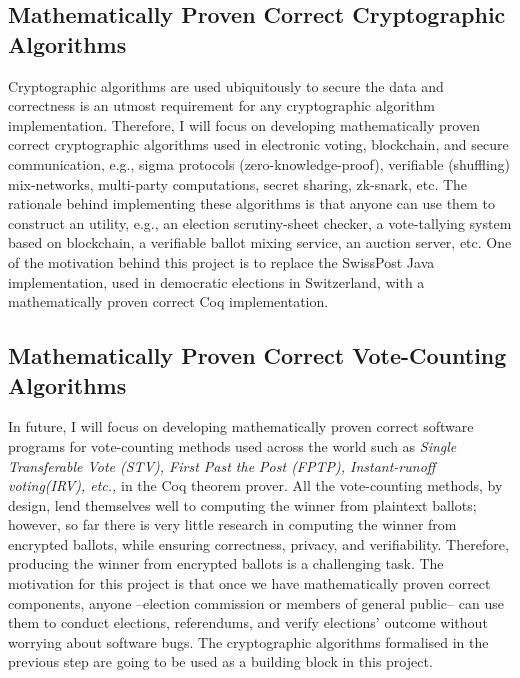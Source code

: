 \documentclass[11pt,a4paper,roman]{moderncv}
\begin{document}
\subsection{Mathematically Proven Correct Cryptographic Algorithms}
	Cryptographic algorithms are used ubiquitously to secure 
	the data and correctness is an utmost requirement for 
	any cryptographic algorithm implementation. Therefore, 
	I will focus on developing mathematically proven correct cryptographic 
	algorithms used in electronic voting, blockchain, and secure communication, e.g., 
  	sigma protocols (zero-knowledge-proof), verifiable (shuffling) mix-networks, 
  	multi-party computations, secret sharing, zk-snark, etc.
	The rationale behind implementing these algorithms is that anyone can use them to construct 
	an utility, e.g., an election scrutiny-sheet checker, 
	a vote-tallying system based on blockchain,
	a verifiable ballot mixing service, an auction server, etc. One of the motivation
	behind this project is to replace the SwissPost Java implementation, used in democratic elections in 
	Switzerland, with a mathematically proven correct Coq implementation.
	

	

\subsection{Mathematically Proven Correct Vote-Counting Algorithms}
In future, I will focus on developing mathematically proven correct
software programs for vote-counting methods used across the world
such as \textit{Single Transferable Vote (STV), 
First Past the Post (FPTP), Instant-runoff voting(IRV), etc.,} in the Coq theorem prover. 
All the vote-counting methods, by design, lend themselves well to computing the 
winner from plaintext ballots; however, so far there is very little research in computing 
the winner from encrypted ballots, while ensuring correctness, privacy, and 
verifiability. Therefore, producing the winner from encrypted 
ballots is a challenging task.
The motivation for this project is that once we have  mathematically proven correct 
components, anyone --election commission or members of general public-- can use them 
to conduct elections, referendums, and verify elections' outcome 
without worrying about software bugs.  The cryptographic algorithms formalised in 
the previous step are going to be used as a building block in this project.



 
\end{document}
